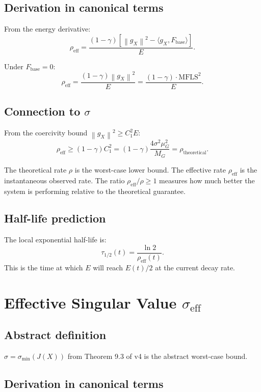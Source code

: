 \documentclass[11pt,a4paper]{article}
\theoremstyle{definition}
\newcommand{\norm}[1]{\left\|#1\right\|}
\newcommand{\Fbase}{F_{\mathrm{base}}}
\newcommand{\gX}{g_X}
\newcommand{\mfls}{\mathrm{MFLS}}
\begin{document}
\subsection{Derivation in canonical terms}

From the energy derivative:
\[
\rho_\mathrm{eff} = \frac{(1-\gamma)\left[\norm{\gX}^2 - \langle\gX,\Fbase\rangle\right]}{E}.
\]

Under $\Fbase = 0$:
\[
\rho_\mathrm{eff} = \frac{(1-\gamma)\norm{\gX}^2}{E} = \frac{(1-\gamma)\cdot\mfls^2}{E}.
\]

\subsection{Connection to $\sigma$}

From the coercivity bound $\norm{\gX}^2 \geq C_1^2 E$:
\[
\rho_\mathrm{eff} \geq (1-\gamma)C_1^2 = (1-\gamma)\frac{4\sigma^2\mu_G^2}{M_G} = \rho_\text{theoretical}.
\]

The theoretical rate $\rho$ is the worst-case lower bound.
The effective rate $\rho_\mathrm{eff}$ is the instantaneous observed rate.
The ratio $\rho_\mathrm{eff}/\rho \geq 1$ measures how much better the system is
performing relative to the theoretical guarantee.

\subsection{Half-life prediction}

The local exponential half-life is:
\[
\tau_{1/2}(t) = \frac{\ln 2}{\rho_\mathrm{eff}(t)}.
\]
This is the time at which $E$ will reach $E(t)/2$ at the current decay rate.

\section{Effective Singular Value $\sigma_\mathrm{eff}$}

\subsection{Abstract definition}

$\sigma = \sigma_{\min}(J(X))$ from Theorem 9.3 of v4 is the abstract worst-case bound.

\subsection{Derivation in canonical terms}
\end{document}
